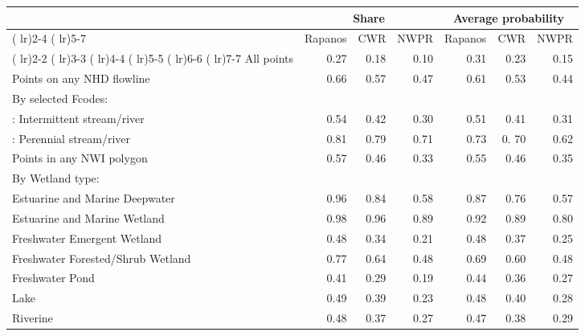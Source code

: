 \begin{tabular}{lrrrrrr}
  &  \multicolumn{3}{c}{Share} & \multicolumn{3}{c}{Average probability} \\
  \cmidrule( lr){2-4} \cmidrule( lr){5-7}
 & Rapanos & CWR & NWPR & Rapanos & CWR & NWPR \\
 \cmidrule( lr){2-2} \cmidrule( lr){3-3} \cmidrule( lr){4-4} \cmidrule( lr){5-5} \cmidrule( lr){6-6} \cmidrule( lr){7-7}
All points & 0.27 & 0.18 & 0.10 & 0.31 & 0.23 & 0.15 \\
\midrule
Points on any NHD flowline & 0.66 & 0.57 & 0.47 & 0.61 & 0.53 & 0.44 \\
\multicolumn{7}{l}{By selected Fcodes:} \\
\quad 46003: Intermittent stream/river & 0.54 & 0.42 & 0.30 & 0.51 & 0.41 & 0.31 \\
\quad 46006: Perennial stream/river & 0.81 & 0.79 & 0.71 & 0.73 & 0. 70 & 0.62 \\
\midrule
Points in any NWI polygon & 0.57 & 0.46 & 0.33 & 0.55 & 0.46 & 0.35 \\
\multicolumn{7}{l}{By Wetland type:} \\
\quad Estuarine and Marine Deepwater & 0.96 & 0.84 & 0.58 & 0.87 & 0.76 & 0.57 \\
\quad Estuarine and Marine Wetland & 0.98 & 0.96 & 0.89 & 0.92 & 0.89 & 0.80 \\
\quad Freshwater Emergent Wetland & 0.48 & 0.34 & 0.21 & 0.48 & 0.37 & 0.25 \\
\quad Freshwater Forested/Shrub Wetland & 0.77 & 0.64 & 0.48 & 0.69 & 0.60 & 0.48 \\
\quad Freshwater Pond & 0.41 & 0.29 & 0.19 & 0.44 & 0.36 & 0.27 \\
\quad Lake & 0.49 & 0.39 & 0.23 & 0.48 & 0.40 & 0.28 \\
\quad Riverine & 0.48 & 0.37 & 0.27 & 0.47 & 0.38 & 0.29 \\

\end{tabular}
